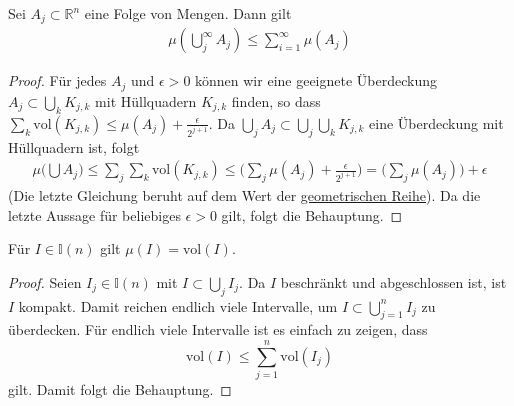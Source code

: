 \begin{Satz}
Sei $A_j \subset \mathbb{R}^n$ eine Folge von Mengen. Dann gilt
\begin{align*}
\mu (\bigcup_j^{\infty} A_j ) \leq \sum_{i=1}^{\infty} \mu(A_j)
\end{align*}
\end{Satz}
\begin{proof}
Für jedes $A_j$ und $\epsilon > 0$ können wir  eine geeignete Überdeckung  $A_j \subset \bigcup_k  K_{j,k}$ mit Hüllquadern $K_{j,k}$ finden, so dass 
 $\sum_k \text{vol} (K_{j,k}) \leq \mu(A_j) + \frac{\epsilon}{2^{j+1}}$.
Da $ \bigcup_j A_j \subset \bigcup_j \bigcup_k  K_{j,k}$ eine Überdeckung mit Hüllquadern ist, folgt
\begin{align*}
\mu \biggl (  \bigcup A_j  \biggr) \leq \sum_j \sum_k \text{vol} (K_{j,k}) \leq  \bigl( \sum_j  \mu(A_j) + \frac{\epsilon}{2^{j+1}} \bigr)  = \bigl (\sum_j \mu(A_j) \bigr ) + \epsilon
\end{align*}
(Die letzte Gleichung beruht auf dem Wert der \href{https://de.wikipedia.org/wiki/Geometrische_Reihe}{geometrischen Reihe}).
Da die letzte Aussage für beliebiges $\epsilon > 0$ gilt, folgt die Behauptung.
\end{proof}


\begin{Bemerkung}
\label{volimu}
Für $I \in \mathbb{I}(n)$ gilt $\mu(I) = \text{vol}(I)$.
\end{Bemerkung}
\begin{proof}
Seien  $I_j \in \mathbb{I}(n)$ mit $I \subset \bigcup_j  I_j$. Da $I$ beschränkt und abgeschlossen ist, ist $I$ kompakt. Damit reichen endlich 
viele Intervalle, um $I  \subset  \bigcup_{j=1}^n  I_j$ zu überdecken. Für endlich viele Intervalle ist es einfach zu zeigen, dass
$$\text{vol} (I) \leq \sum_{j=1}^n \text{vol} (I_j) $$
gilt. Damit folgt die Behauptung.
\end{proof}

